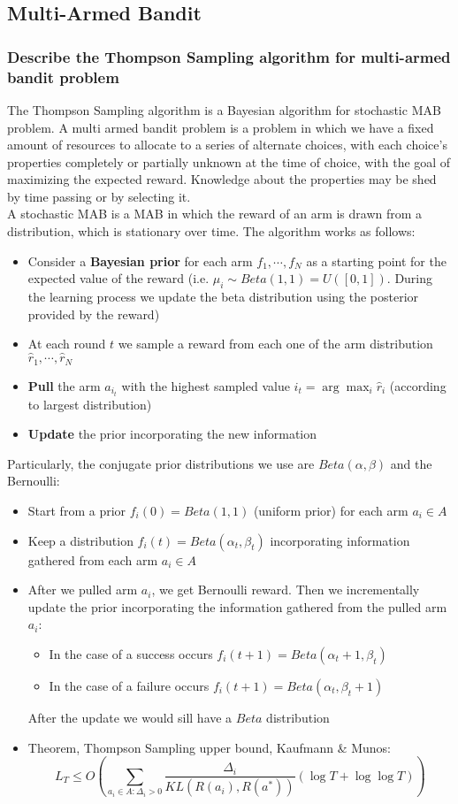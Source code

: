 \subsection{Multi-Armed Bandit}
\subsubsection{Describe the Thompson Sampling algorithm for multi-armed bandit problem}
    The Thompson Sampling algorithm is a Bayesian algorithm for stochastic MAB problem. A multi armed bandit problem is a problem in which we have a fixed amount of resources to allocate to a series of alternate choices, with each choice's properties completely or partially unknown at the time of choice, with the goal of maximizing the expected reward. Knowledge about the properties may be shed by time passing or by selecting it.\\
    A stochastic MAB is a MAB in which the reward of an arm is drawn from a distribution, which is stationary over time.
    The algorithm works as follows:
    \begin{itemize}
        \item Consider a \textbf{Bayesian prior} for each arm $f_1,\cdots,f_N$ as a starting point for the expected value of the reward (i.e. $\mu_i\sim Beta(1,1)=U([0,1])$. During the learning process we update the beta distribution using the posterior provided by the reward)
        \item At each round $t$ we sample a reward from each one of the arm distribution $\hat{r}_1,\cdots,\hat{r}_N$
        \item \textbf{Pull} the arm $a_{i_t}$ with the highest sampled value $i_t=\arg\max_i\hat{r}_i$ (according to largest distribution)
        \item \textbf{Update} the prior incorporating the new information
    \end{itemize}
    Particularly, the conjugate prior distributions we use are $Beta(\alpha, \beta)$ and the Bernoulli:
    \begin{itemize}
        \item Start from a prior $f_i(0)=Beta(1,1)$ (uniform prior) for each arm $a_i\in A$
        \item Keep a distribution $f_i(t)=Beta(\alpha_t,\beta_t)$ incorporating information gathered from each arm $a_i\in A$
        \item After we pulled arm $a_i$, we get Bernoulli reward. Then we incrementally update the prior incorporating the information gathered from the pulled arm $a_i$:
        \begin{itemize}
            \item In the case of a success occurs $f_i(t+1)=Beta(\alpha_t+1,\beta_t)$
            \item In the case of a failure occurs $f_i(t+1)=Beta(\alpha_t,\beta_t+1)$
        \end{itemize}
        After the update we would sill have a $Beta$ distribution
        \item Theorem, Thompson Sampling upper bound, Kaufmann \& Munos:
        $$L_T\leq O\left(\sum_{a_i\in A:\Delta_i>0}\frac{\Delta_i}{KL(R(a_i),R(a^*))}(\log T+\log\log T)\right)$$
    \end{itemize}
